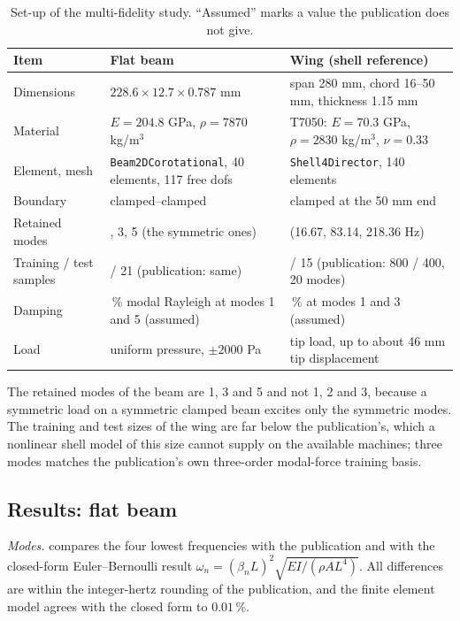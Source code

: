 \begin{table}[tbp]
\centering\footnotesize
\caption{Set-up of the multi-fidelity study. ``Assumed'' marks a value the publication does not give.}\label{tab:vf-mfs-setup}
\begin{tabularx}{\linewidth}{@{}>{\raggedright\arraybackslash}p{3.0cm} >{\raggedright\arraybackslash}X >{\raggedright\arraybackslash}X@{}}
\toprule
Item & Flat beam & Wing (shell reference)\\
\midrule
Dimensions & $228.6\times12.7\times0.787$ mm & span 280 mm, chord 16--50 mm, thickness 1.15 mm\\
Material & $E=204.8$ GPa, $\rho=7870$ kg/m$^3$ & T7050: $E=70.3$ GPa, $\rho=2830$ kg/m$^3$, $\nu=0.33$\\
Element, mesh & \texttt{Beam2DCorotational}, 40 elements, 117 free dofs & \texttt{Shell4Director}, 140 elements\\
Boundary & clamped--clamped & clamped at the 50 mm end\\
Retained modes & 1, 3, 5 (the symmetric ones) & 3 (16.67, 83.14, 218.36 Hz)\\
Training / test samples & 30 / 21 (publication: same) & 30 / 15 (publication: 800 / 400, 20 modes)\\
Damping & 1\,\% modal Rayleigh at modes 1 and 5 (assumed) & 1\,\% at modes 1 and 3 (assumed)\\
Load & uniform pressure, $\pm2000$ Pa & tip load, up to about 46 mm tip displacement\\
\bottomrule
\end{tabularx}
\end{table}

The retained modes of the beam are 1, 3 and 5 and not 1, 2 and 3, because a symmetric load on a symmetric clamped beam excites only the symmetric modes. The training and test sizes of the wing are far below the publication's, which a nonlinear shell model of this size cannot supply on the available machines; three modes matches the publication's own three-order modal-force training basis.

\subsection*{Results: flat beam}

\emph{Modes.}  compares the four lowest frequencies with the publication and with the closed-form Euler--Bernoulli result $\omega_n=(\beta_nL)^2\sqrt{EI/(\rho AL^4)}$. All differences are within the integer-hertz rounding of the publication, and the finite element model agrees with the closed form to $0.01\,\%$.

